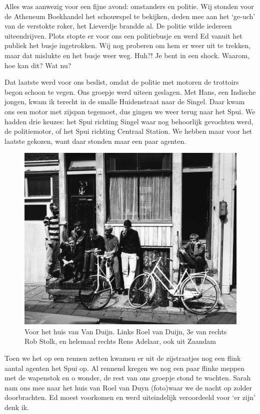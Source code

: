 \documentclass[10pt,twoside, openright]{memoir}
\begin{document}
Alles was aanwezig voor een fijne avond: omstanders en politie. Wij stonden voor de Atheneum Boekhandel het schouwspel te bekijken, deden mee aan het ‘ge-uch’ van de verstokte roker, het Lieverdje brandde al. De politie wilde iedereen uiteendrijven. Plots stopte er voor ons een politiebusje en werd Ed vanuit het publiek het busje ingetrokken. Wij nog proberen om hem er weer uit te trekken, maar dat mislukte en het busje weer weg. Huh?! Je bent in een shock. Waarom, hoe kan dit? Wat nu? 

Dat laatste werd voor ons beslist, omdat de politie met motoren de trottoirs begon schoon te vegen. Ons groepje werd uiteen geslagen. Met Hans, een Indische jongen, kwam ik terecht in de smalle Huidenstraat naar de Singel. Daar kwam ons een motor met zijspan tegemoet, dus gingen we weer terug naar het Spui. We hadden drie keuzes: het Spui richting Singel waar nog behoorlijk gevochten werd, de politiemotor, of het Spui richting Centraal Station. We hebben maar voor het laatste gekozen, want daar stonden maar een paar agenten. 


\begin{figure}
\includegraphics[width=\textwidth]{img/152-duijn-stolk}
\caption*{\footnotesize Voor het huis van Van Duijn. Links Roel van Duijn, 3e van rechts Rob Stolk, en helemaal rechts Rens Adelaar, ook uit Zaandam}
\end{figure}

Toen we het op een rennen zetten kwamen er uit de zijstraatjes nog een flink aantal agenten het Spui op. Al rennend kregen we nog een paar flinke meppen met de wapenstok en o wonder, de rest van ons groepje stond te wachten. Sarah nam ons mee naar het huis van Roel van Duyn (foto)waar we de nacht op zolder doorbrachten. Ed moest voorkomen en werd uiteindelijk veroordeeld voor ‘er zijn’ denk ik. 
\end{document}
